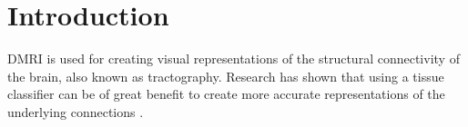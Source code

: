 \documentclass[twocolumn]{bmcart}%
\begin{document}
\begin{frontmatter}
\begin{fmbox}


	








%
\end{fmbox}%

\end{frontmatter}


\section{Introduction}\label{introduction}

DMRI is used for creating visual representations of the structural
connectivity of the brain, also known as tractography. Research has
shown that using a tissue classifier can be of great benefit to create
more accurate representations of the underlying connections
\cite{Girard2014}.
\end{document}
